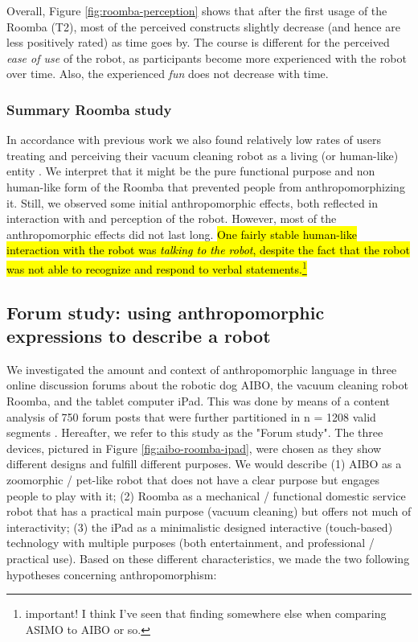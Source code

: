 \documentclass{frontiersSCNS} %
\begin{document}
Overall, Figure \ref{fig:roomba-perception} shows that after the first usage of
the Roomba (T2), most of the perceived constructs slightly decrease (and hence
are less positively rated) as time goes by. The course is different for the
perceived \textit{ease of use} of the robot, as participants become more
experienced with the robot over time. Also, the experienced \textit{fun} does
not decrease with time.
 

\subsubsection{Summary Roomba study\\}

In accordance with previous work we also found relatively low rates of users
treating and perceiving their vacuum cleaning robot as a living (or human-like)
entity \citep{sung_housewives_2008}. We interpret that it might be the pure
functional purpose and non human-like form of the Roomba that prevented people
from anthropomorphizing it. Still, we observed some initial anthropomorphic
effects, both reflected in interaction with and perception of the robot.
However, most of the anthropomorphic effects did not last long. \hl{One fairly
stable human-like interaction with the robot was \textit{talking to the robot},
despite the fact that the robot was not able to recognize and respond to verbal
statements.\footnote{important! I think I've seen that finding somewhere else
when comparing ASIMO to AIBO or so.}}


\subsection{Forum study: using anthropomorphic expressions to describe a robot}

We investigated the amount and context of anthropomorphic language in three
online discussion forums about the robotic dog AIBO, the vacuum cleaning robot
Roomba, and the tablet computer iPad. This was done by means of a content
analysis of 750 forum posts that were further partitioned in n = 1208 valid
segments \citep{fink_anthropomorphic_2012}. Hereafter, we refer to this study as
the "Forum study". The three devices, pictured in Figure
\ref{fig:aibo-roomba-ipad}, were chosen as they show different designs and
fulfill different purposes. We would describe (1) AIBO as a zoomorphic /
pet-like robot that does not have a clear purpose but engages people to play
with it; (2) Roomba as a mechanical / functional domestic service robot that has
a practical main purpose (vacuum cleaning) but offers not much of interactivity;
(3) the iPad as a minimalistic designed interactive (touch-based) technology
with multiple purposes (both entertainment, and professional / practical use).
Based on these different characteristics, we made the two following hypotheses
concerning anthropomorphism:
\end{document}
